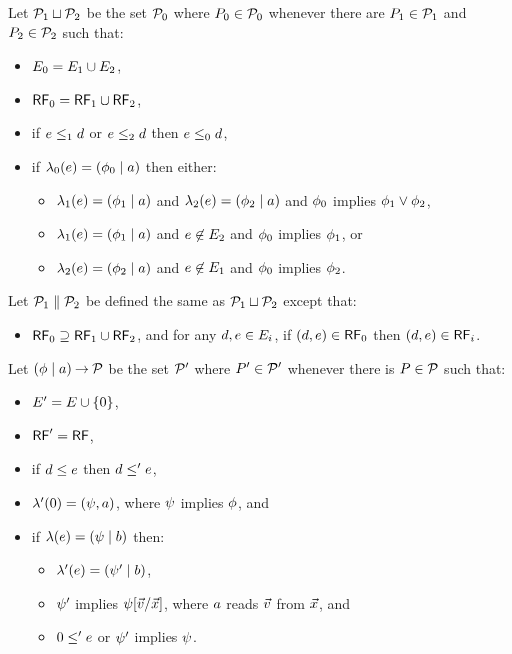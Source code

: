 Let $\mathcal{P}_1 \sqcup \mathcal{P}_2$ be the set $\mathcal{P}_0$ where $P_0 \in \mathcal{P}_0$
whenever there are $P_1 \in \mathcal{P}_1$ and  $P_2 \in \mathcal{P}_2$ such that:
\begin{itemize}
\item $E_0 = E_1 \cup E_2$,
\item $\mathsf{RF}_0 = \mathsf{RF}_1 \cup \mathsf{RF}_2$,
\item if $e \le_1 d$ or $e \le_2 d$ then $e \le_0 d$,
\item if $\lambda_0(e) = (\phi_0 \mid a)$ then either:
  \begin{itemize}
  \item $\lambda_1(e) = (\phi_1 \mid a)$ and $\lambda_2(e) = (\phi_2 \mid a)$
    and $\phi_0$ implies $\phi_1 \lor \phi_2$,
  \item $\lambda_1(e) = (\phi_1 \mid a)$ and $e \not\in E_2$
    and $\phi_0$ implies $\phi_1$, or
  \item $\lambda_2(e) = (\phi_2 \mid a)$ and $e \not\in E_1$
    and $\phi_0$ implies $\phi_2$.
  \end{itemize}
\end{itemize}
Let $\mathcal{P}_1 \parallel \mathcal{P}_2$ be defined the same as $\mathcal{P}_1 \sqcup \mathcal{P}_2$ except that:
\begin{itemize}
\item $\mathsf{RF}_0 \supseteq \mathsf{RF}_1 \cup \mathsf{RF}_2$, and
 for any $d, e \in E_i$, if $(d,e)\in\mathsf{RF}_0$ then $(d,e)\in\mathsf{RF}_i$.
\end{itemize}
Let $(\phi \mid a) \mathbin\rightarrow \mathcal{P}$ be the set $\mathcal{P}'$ where $P'\in\mathcal{P}'$ whenever
there is $P\in\mathcal{P}$ such that:
\begin{itemize}
\item $E' = E \cup \{0\}$,
\item $\mathsf{RF}' = \mathsf{RF}$,
\item if $d \le e$ then $d \le' e$,
\item $\lambda'(0) = (\psi, a)$, where $\psi$ implies $\phi$, and
\item if $\lambda(e) = (\psi \mid b)$ then:
  \begin{itemize}
  \item $\lambda'(e) = (\psi' \mid b)$,
  \item $\psi'$ implies $\psi[\vec{v}/\vec{x}]$, where $a$ reads $\vec{v}$ from $\vec{x}$, and
  \item $0 \le' e$ or $\psi'$ implies $\psi$.
  \end{itemize}
\end{itemize}

